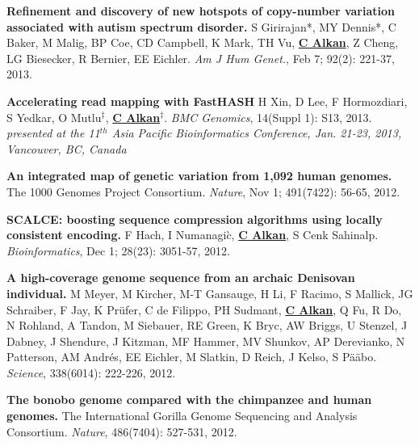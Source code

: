  \vspace{-.2cm}
        {\bf Refinement and discovery of new hotspots of copy-number variation associated with autism spectrum disorder.}
        S Girirajan*, MY Dennis*, C Baker, M Malig, BP Coe, CD Campbell, K Mark, TH Vu,
        {\bf {\underline {C Alkan}}}, Z Cheng, LG Biesecker, R Bernier, EE Eichler.
        {\em Am J Hum Genet.}, Feb 7; 92(2): 221-37, 2013.

 \vspace{-.2cm}
        {\bf Accelerating read mapping with FastHASH}
        H Xin, D Lee, F Hormozdiari, S Yedkar, O Mutlu$^\ddag$, {\bf {\underline {C Alkan}}}$^\ddag$.
        {\em BMC Genomics}, 14(Suppl 1): S13, 2013.\\
        \hspace*{1cm} {\footnotesize {\em presented at the  11$^{th}$  Asia Pacific Bioinformatics Conference,
            Jan. 21-23, 2013, Vancouver, BC, Canada}}
       
        
 \vspace{-.2cm}
        {\bf An integrated map of genetic variation from 1,092 human genomes.}
        The 1000 Genomes Project Consortium. 
        {\em Nature}, Nov 1; 491(7422): 56-65, 2012.
        
 \vspace{-.2cm}
        {\bf SCALCE: boosting sequence compression algorithms using locally consistent encoding.}
        F Hach, I Numanagi\`{c}, {\bf {\underline {C Alkan}}}, S Cenk Sahinalp.  
        {\em Bioinformatics}, Dec 1; 28(23): 3051-57, 2012.

 \vspace{-.2cm}
        {\bf A high-coverage genome sequence from an archaic Denisovan individual.}
        M Meyer, M Kircher, M-T Gansauge, H Li, F Racimo, S Mallick, JG Schraiber, F Jay, K Pr\"{u}fer, C de Filippo, PH Sudmant, 
        {\bf {\underline {C Alkan}}}, Q Fu, R Do, N Rohland, A Tandon, M Siebauer, RE Green, 
        K Bryc, AW Briggs, U Stenzel, J Dabney, J Shendure, J Kitzman, MF Hammer, MV Shunkov, 
        AP Derevianko, N Patterson, AM Andr\'{e}s, EE Eichler, M Slatkin, D Reich, J Kelso, S P\"{a}\"{a}bo. 
        {\em Science}, 338(6014): 222-226, 2012.

 \vspace{-.2cm}
        {\bf The bonobo genome compared with the chimpanzee and human genomes.}
        The International Gorilla Genome Sequencing and Analysis Consortium.
        {\em Nature}, 486(7404): 527-531, 2012.


